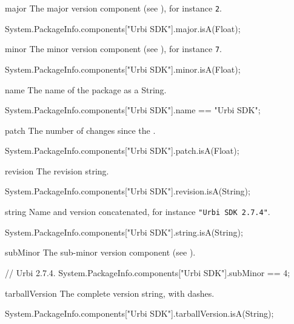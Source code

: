 \begin{urbiscriptapi}
\item[major] The major version component (see ), for
  instance \lstinline|2|.
\begin{urbiassert}
System.PackageInfo.components["Urbi SDK"].major.isA(Float);
\end{urbiassert}


\item[minor] The minor version component (see ), for
  instance \lstinline|7|.
\begin{urbiassert}
System.PackageInfo.components["Urbi SDK"].minor.isA(Float);
\end{urbiassert}


\item[name] The name of the package as a String.
\begin{urbiassert}
System.PackageInfo.components["Urbi SDK"].name
  == "Urbi SDK";
\end{urbiassert}


\item[patch] The number of changes since the .
\begin{urbiassert}
System.PackageInfo.components["Urbi SDK"].patch.isA(Float);
\end{urbiassert}


\item[revision] The revision string.
\begin{urbiassert}
System.PackageInfo.components["Urbi SDK"].revision.isA(String);
\end{urbiassert}


\item[string] Name and version concatenated, for instance
  \lstinline|"Urbi SDK 2.7.4"|.
\begin{urbiassert}
System.PackageInfo.components["Urbi SDK"].string.isA(String);
\end{urbiassert}


\item[subMinor] The sub-minor version component (see ).
\begin{urbiassert}
// Urbi 2.7.4.
System.PackageInfo.components["Urbi SDK"].subMinor
  == 4;
\end{urbiassert}


\item[tarballVersion] The complete version string, with dashes.
\begin{urbiassert}
System.PackageInfo.components["Urbi SDK"].tarballVersion.isA(String);
\end{urbiassert}



\end{urbiscriptapi}
